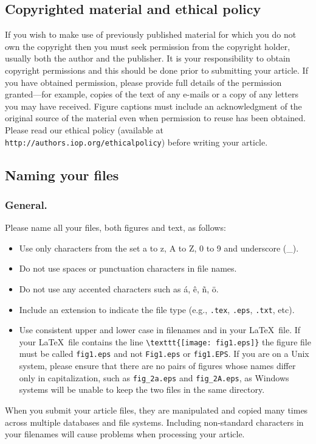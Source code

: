 \documentclass[12pt]{iopart}
\begin{document}
\subsection{\label{copyright}Copyrighted material and ethical policy} If you wish to make use of previously published material for which you do not own the copyright then you must seek permission from the copyright holder, usually both the author and the publisher.  It is your responsibility to obtain copyright permissions and this should be done prior to submitting your article. If you have obtained permission, please provide full details of the permission granted---for example, copies of the text of any e-mails or a copy of any letters you may have received. Figure captions must include an acknowledgment of the original source of the material even when permission to reuse has been obtained.  Please read our ethical policy (available at \verb"http://authors.iop.org/ethicalpolicy") before writing your article.

\subsection{Naming your files}
\subsubsection{General.}
Please name all your files, both figures and text, as follows:
\begin{itemize}
\item Use only characters from the set a to z, A to Z, 0 to 9 and underscore (\_).
\item Do not use spaces or punctuation characters in file names.
\item Do not use any accented characters such as
\'a, \^e, \~n, \"o.
\item Include an extension to indicate the file type (e.g., \verb".tex", \verb".eps", \verb".txt", etc).
\item Use consistent upper and lower case in filenames and in your \LaTeX\ file.
If your \LaTeX\ file contains the line \verb"\texttt{[image: fig1.eps]}" the figure file must be called
\verb"fig1.eps" and not \verb"Fig1.eps" or \verb"fig1.EPS".  If you are on a Unix system, please ensure that
there are no pairs of figures whose names differ only in capitalization, such as \verb"fig_2a.eps" and \verb"fig_2A.eps",
as Windows systems will be unable to keep the two files in the same directory.
\end{itemize}
When you submit your article files, they are manipulated
and copied many times across multiple databases and file systems. Including non-standard
characters in your filenames will cause problems when processing your article.
\end{document}
